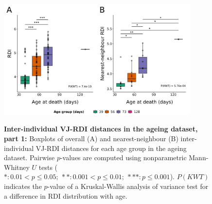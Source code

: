 \begin{figure}
\centering
\includegraphics[width = 0.9\textwidth]{_Figures/png/ageing-rdi-VJ-individual-groupdist}
\begin{subfigure}{0em}
\label{fig:igseq-ageing-rdi-VJ-individual-groupdist-all}
\end{subfigure}
\begin{subfigure}{0em}
\label{fig:igseq-ageing-rdi-VJ-individual-groupdist-nn}
\end{subfigure}
\caption[Inter-individual VJ-RDI distances in the \igseq ageing dataset, part 1]{\textbf{Inter-individual VJ-RDI distances in the \igseq ageing dataset, part 1:} Boxplots of overall (A) and nearest-neighbour (B) inter-individual VJ-RDI distances for each age group in the \igseq ageing dataset. Pairwise $p$-values are computed using nonparametric Mann-Whitney $U$ tests ($*: 0.01 < p \leq 0.05;~**: 0.001 < p \leq 0.01;~***: p \leq 0.001$). $P(KWT)$ indicates the $p$-value of a Kruskal-Wallis analysis of variance test for a difference in RDI distribution with age.}
\label{fig:igseq-ageing-rdi-VJ-individual-groupdist}
\end{figure}

